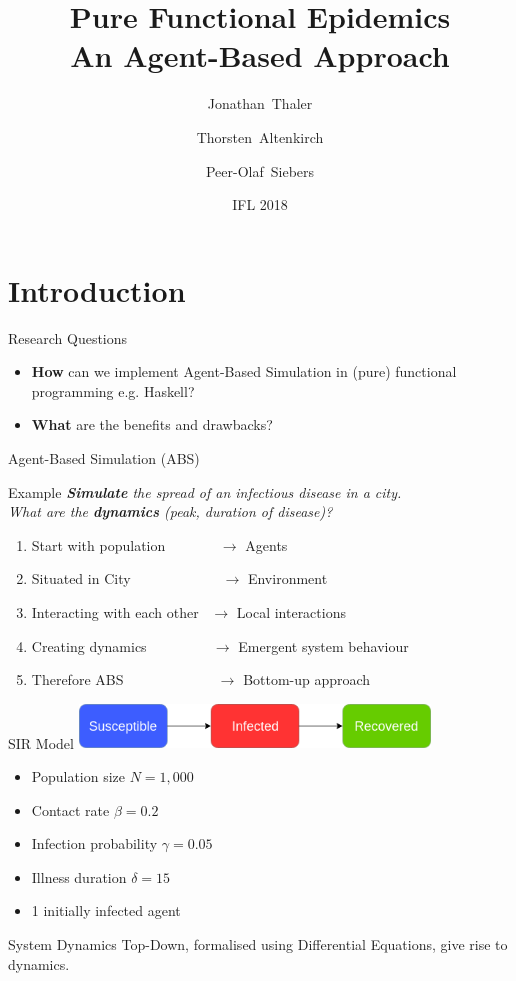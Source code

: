 \documentclass{beamer}
\title[Pure Functional Epidemics] 
{%
  Pure Functional Epidemics \\ An Agent-Based Approach%
}
\author[Thaler, Altenkirch, Siebers]
{
  Jonathan~Thaler \and
  Thorsten~Altenkirch \and
  Peer-Olaf~Siebers
}
\institute[University of Nottingham, United Kingdom]
{
  University of Nottingham, United Kingdom
}
\date[Implementation and Application of Functional Languages (IFL) 2018]
{IFL 2018}
\begin{document}
\begin{frame}
  \titlepage
\end{frame}

\section{Introduction}
\begin{frame}{Research Questions}
\begin{itemize}
  \item \textbf{How} can we implement Agent-Based Simulation in (pure) functional programming e.g. Haskell?
  \item \textbf{What} are the benefits and drawbacks?
\end{itemize}
\end{frame}

\begin{frame}{Agent-Based Simulation (ABS)} 
  \begin{block}{Example}
    \textit{\textbf{Simulate} the spread of an infectious disease in a city. \\ What are the \textbf{dynamics} (peak, duration of disease)?}
  \end{block}
  
  \begin{enumerate}
    \item Start with population \, \, \, \, \, \, \, $\to$ Agents
 	\item Situated in City \, \, \, \, \, \, \, \, \, \, \, \,\, $\to$ Environment
 	\item Interacting with each other \, $\to$ Local interactions
 	\item Creating dynamics \, \, \, \, \, \, \, \,\,\, $\to$ Emergent system behaviour
 	\item Therefore ABS \, \, \, \, \, \, \, \, \, \, \, \,\,\, $\to$ Bottom-up approach
  \end{enumerate}
\end{frame}

\begin{frame}{SIR Model}
  \includegraphics[width=0.7\textwidth]{./fig/SIR_transitions.png}
  
  \begin{itemize}
    \item Population size $N = 1,000$
 	\item Contact rate $\beta = 0.2$
 	\item Infection probability $\gamma = 0.05$
 	\item Illness duration $\delta = 15$
 	\item 1 initially infected agent
  \end{itemize}
    
  \begin{block}{System Dynamics}
    Top-Down, formalised using Differential Equations, give rise to dynamics.
  \end{block}
\end{frame}
\end{document}
